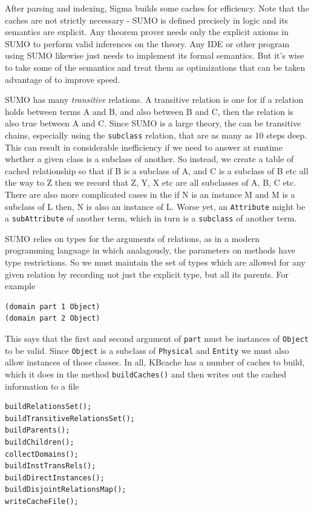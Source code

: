\documentclass{book}
\begin{document}
After parsing and indexing, Sigma builds some caches for efficiency.  Note that
the caches are not strictly necessary - SUMO is defined precisely in logic and its
semantics are explicit.  Any theorem prover needs only the explicit axioms in SUMO
to perform valid inferences on the theory.  Any IDE or other program using SUMO likewise
just needs to implement its formal semantics.  But it's wise to take some of the semantics and
treat them as optimizations that can be taken advantage of to improve speed.

SUMO has many
\textit{transitive} relations.  A transitive relation is one for if a relation holds
between terms A and B, and also between B and C, then the relation is also true between
A and C.  Since SUMO is a large theory, the can be transitive chains, especially using the
\texttt{subclass} relation, that are as many as 10 steps deep.  This can result in
considerable inefficiency if we need to answer at runtime whether a given class is a subclass
of another.  So instead, we create a table of cached relationship so that if B is a subclass of
A, and C is a subclass of B etc all the way to Z then we record that Z, Y, X etc are all subclasses
of A, B, C etc.  There are also more complicated cases in the if N is an instance M and M is
a subclass of L then, N is also an instance of L.  Worse yet, an \texttt{Attribute} might be a
\texttt{subAttribute} of another term, which in turn is a \texttt{subclass} of another term.

SUMO relies on types for the arguments of relations, as in a modern programming language in which
analagously, the parameters on methods have type restrictions.  So we must maintain the set of
types which are allowed for any given relation by recording not just the explicit type, but all
its parents.  For example

\begin{lstlisting}[basicstyle=\ttfamily\small\bfseries]
(domain part 1 Object)
(domain part 2 Object)
\end{lstlisting}

This says that the first and second argument of \texttt{part} must be instances of \texttt{Object}
to be valid.  Since \texttt{Object} is a subclass of \texttt{Physical} and \texttt{Entity} we must
also allow instances of those classes.  In all, KBcache has a number of caches to build, which it
does in the method \texttt{buildCaches()} and then writes out the cached information to a file

\begin{lstlisting}[basicstyle=\ttfamily\small\bfseries]
buildRelationsSet();
buildTransitiveRelationsSet();
buildParents();
buildChildren();
collectDomains();
buildInstTransRels();
buildDirectInstances();
buildDisjointRelationsMap();
writeCacheFile();
\end{lstlisting}
\end{document}
